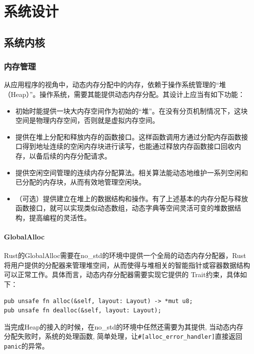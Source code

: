 \chapter{系统设计}
\label{chap:SystemDesign}


\section{系统内核}

\subsection{内存管理}

从应用程序的视角中，动态内存分配中的内存，依赖于操作系统管理的“堆 （Heap）”。操作系统，需要其能提供动态内存分配。其设计上应当有如下功能：

\begin{itemize}
\item 初始时能提供一块大内存空间作为初始的“堆”。在没有分页机制情况下，这块空间是物理内存空间，否则就是虚拟内存空间。
\item 提供在堆上分配和释放内存的函数接口。这样函数调用方通过分配内存函数接口得到地址连续的空闲内存块进行读写，也能通过释放内存函数接口回收内存，以备后续的内存分配请求。
\item 提供空闲空间管理的连续内存分配算法。相关算法能动态地维护一系列空闲和已分配的内存块，从而有效地管理空闲块。
\item （可选）提供建立在堆上的数据结构和操作。有了上述基本的内存分配与释放函数接口，就可以实现类似动态数组，动态字典等空间灵活可变的堆数据结构，提高编程的灵活性。
\end{itemize}

\subsubsection{GlobalAlloc}
Rust的GlobalAlloc需要在no\_std的环境中提供一个全局的动态内存分配器，Rust将用户提供的分配器来管理堆空间，从而使得与堆相关的智能指针或容器数据结构可以正常工作。具体而言，动态内存分配器需要实现它提供的 Trait约束，具体如下：

\begin{lstlisting}[caption=GlobalAlloc的Trait约束]
pub unsafe fn alloc(&self, layout: Layout) -> *mut u8;
pub unsafe fn dealloc(&self, layout: Layout);
\end{lstlisting}

当完成Heap的接入的时候，在no\_std的环境中任然还需要为其提供, 当动态内存分配失败时，系统的处理函数, 简单处理，让\verb|#[alloc_error_handler]|直接返回\verb|panic|的异常。

